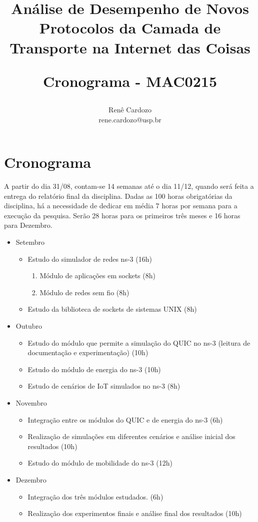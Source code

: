 \documentclass{article}
\author{Renê Cardozo \\ 
        rene.cardozo@usp.br}
\title{Análise de Desempenho de Novos Protocolos da Camada de Transporte na Internet das Coisas \\
\begin{Large} Cronograma - MAC0215 \end{Large}
}
\date{}
\begin{document}
\maketitle

\section*{Cronograma}
A partir do dia 31/08, contam-se 14 semanas até o dia 11/12, quando será feita a entrega do relatório final da
disciplina. Dadas as 100 horas obrigatórias da disciplina, há a necessidade de dedicar em média 7 horas por semana para
a execução da pesquisa. Serão 28 horas para os primeiros três meses e 16 horas para Dezembro.

\FloatBarrier

\begin{itemize}
\item Setembro
    \begin{itemize}
        \item Estudo do simulador de redes ns-3 (16h)
        \begin{enumerate}
            \item Módulo de aplicações em sockets (8h)
            \item Módulo de redes sem fio (8h)
        \end{enumerate}
        \item Estudo da biblioteca de sockets de sistemas UNIX (8h)
    \end{itemize}
\item Outubro
    \begin{itemize}
        \item Estudo do módulo que permite a simulação do QUIC no ns-3 (leitura de documentação e experimentação) (10h)
        \item Estudo do módulo de energia do ns-3 (10h)
        \item Estudo de cenários de IoT simulados no ns-3 (8h)
    \end{itemize}
\item Novembro
    \begin{itemize}
        \item Integração entre os módulos do QUIC e de energia do ns-3 (6h)
        \item Realização de simulações em diferentes cenários e análise inicial dos resultados (10h)
        \item Estudo do módulo de mobilidade do ns-3 (12h)
    \end{itemize}
\item Dezembro
    \begin{itemize}
        \item Integração dos três módulos estudados. (6h)
        \item Realização dos experimentos finais e análise final dos resultados (10h)
    \end{itemize}
\end{itemize}
\end{document}
